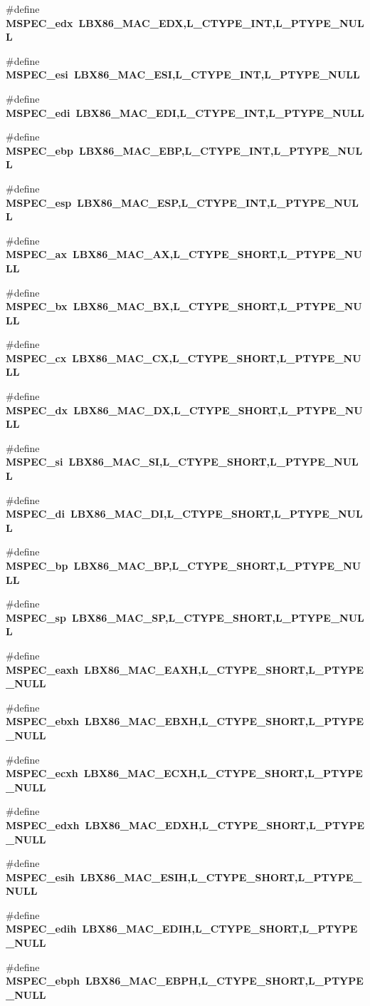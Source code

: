 \begin{CompactItemize}
\item 
\#define \bf{MSPEC\_\-edx}~LBX86\_\-MAC\_\-EDX,L\_\-CTYPE\_\-INT,L\_\-PTYPE\_\-NULL
\item 
\#define \bf{MSPEC\_\-esi}~LBX86\_\-MAC\_\-ESI,L\_\-CTYPE\_\-INT,L\_\-PTYPE\_\-NULL
\item 
\#define \bf{MSPEC\_\-edi}~LBX86\_\-MAC\_\-EDI,L\_\-CTYPE\_\-INT,L\_\-PTYPE\_\-NULL
\item 
\#define \bf{MSPEC\_\-ebp}~LBX86\_\-MAC\_\-EBP,L\_\-CTYPE\_\-INT,L\_\-PTYPE\_\-NULL
\item 
\#define \bf{MSPEC\_\-esp}~LBX86\_\-MAC\_\-ESP,L\_\-CTYPE\_\-INT,L\_\-PTYPE\_\-NULL
\item 
\#define \bf{MSPEC\_\-ax}~LBX86\_\-MAC\_\-AX,L\_\-CTYPE\_\-SHORT,L\_\-PTYPE\_\-NULL
\item 
\#define \bf{MSPEC\_\-bx}~LBX86\_\-MAC\_\-BX,L\_\-CTYPE\_\-SHORT,L\_\-PTYPE\_\-NULL
\item 
\#define \bf{MSPEC\_\-cx}~LBX86\_\-MAC\_\-CX,L\_\-CTYPE\_\-SHORT,L\_\-PTYPE\_\-NULL
\item 
\#define \bf{MSPEC\_\-dx}~LBX86\_\-MAC\_\-DX,L\_\-CTYPE\_\-SHORT,L\_\-PTYPE\_\-NULL
\item 
\#define \bf{MSPEC\_\-si}~LBX86\_\-MAC\_\-SI,L\_\-CTYPE\_\-SHORT,L\_\-PTYPE\_\-NULL
\item 
\#define \bf{MSPEC\_\-di}~LBX86\_\-MAC\_\-DI,L\_\-CTYPE\_\-SHORT,L\_\-PTYPE\_\-NULL
\item 
\#define \bf{MSPEC\_\-bp}~LBX86\_\-MAC\_\-BP,L\_\-CTYPE\_\-SHORT,L\_\-PTYPE\_\-NULL
\item 
\#define \bf{MSPEC\_\-sp}~LBX86\_\-MAC\_\-SP,L\_\-CTYPE\_\-SHORT,L\_\-PTYPE\_\-NULL
\item 
\#define \bf{MSPEC\_\-eaxh}~LBX86\_\-MAC\_\-EAXH,L\_\-CTYPE\_\-SHORT,L\_\-PTYPE\_\-NULL
\item 
\#define \bf{MSPEC\_\-ebxh}~LBX86\_\-MAC\_\-EBXH,L\_\-CTYPE\_\-SHORT,L\_\-PTYPE\_\-NULL
\item 
\#define \bf{MSPEC\_\-ecxh}~LBX86\_\-MAC\_\-ECXH,L\_\-CTYPE\_\-SHORT,L\_\-PTYPE\_\-NULL
\item 
\#define \bf{MSPEC\_\-edxh}~LBX86\_\-MAC\_\-EDXH,L\_\-CTYPE\_\-SHORT,L\_\-PTYPE\_\-NULL
\item 
\#define \bf{MSPEC\_\-esih}~LBX86\_\-MAC\_\-ESIH,L\_\-CTYPE\_\-SHORT,L\_\-PTYPE\_\-NULL
\item 
\#define \bf{MSPEC\_\-edih}~LBX86\_\-MAC\_\-EDIH,L\_\-CTYPE\_\-SHORT,L\_\-PTYPE\_\-NULL
\item 
\#define \bf{MSPEC\_\-ebph}~LBX86\_\-MAC\_\-EBPH,L\_\-CTYPE\_\-SHORT,L\_\-PTYPE\_\-NULL

\end{CompactItemize}
